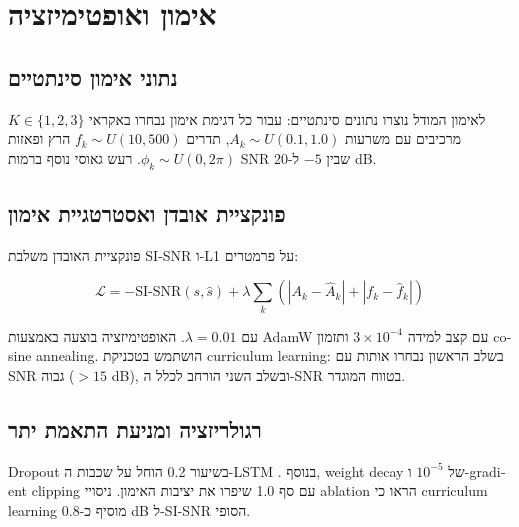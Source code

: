 
\clearpage
\chapter{אימון ואופטימיזציה}

\section{נתוני אימון סינתטיים}

לאימון המודל נוצרו נתונים סינתטיים: עבור כל דגימת אימון נבחרו באקראי \(K \in \{1,2,3\}\) מרכיבים עם משרעות \(A_k \sim U(0.1, 1.0)\), תדרים \(f_k \sim U(10, 500)\) הרץ ופאזות \(\phi_k \sim U(0, 2\pi)\). רעש גאוסי נוסף ברמות \textenglish{SNR} שבין \(-5\) ל-\textenglish{20 dB}.

\section{פונקציית אובדן ואסטרטגיית אימון}

פונקציית האובדן משלבת \textenglish{SI-SNR} ו-\textenglish{L1} על פרמטרים:

\begin{equation}
\mathcal{L} = -\text{SI-SNR}(s, \hat{s}) + \lambda \sum_{k} (|A_k - \hat{A}_k| + |f_k - \hat{f}_k|)
\end{equation}

עם \(\lambda = 0.01\). האופטימיזציה בוצעה באמצעות \textenglish{AdamW} עם קצב למידה \textenglish{$3 \times 10^{-4}$} ותזמון \textenglish{cosine annealing}. הושתמש בטכניקת \textenglish{curriculum learning}: בשלב הראשון נבחרו אותות עם \textenglish{SNR} גבוה (\textenglish{$> 15$ dB}), ובשלב השני הורחב לכלל ה-\textenglish{SNR} בטווח המוגדר.

\section{רגולריזציה ומניעת התאמת יתר}

\textenglish{Dropout} בשיעור \textenglish{0.2} הוחל על שכבות ה-\textenglish{LSTM} \cite{park2024hybrid}. בנוסף, \textenglish{weight decay} של \textenglish{$10^{-5}$} ו-\textenglish{gradient clipping} עם סף \textenglish{1.0} שיפרו את יציבות האימון. ניסויי \textenglish{ablation} הראו כי \textenglish{curriculum learning} מוסיף כ-\textenglish{0.8 dB} ל-\textenglish{SI-SNR} הסופי.
